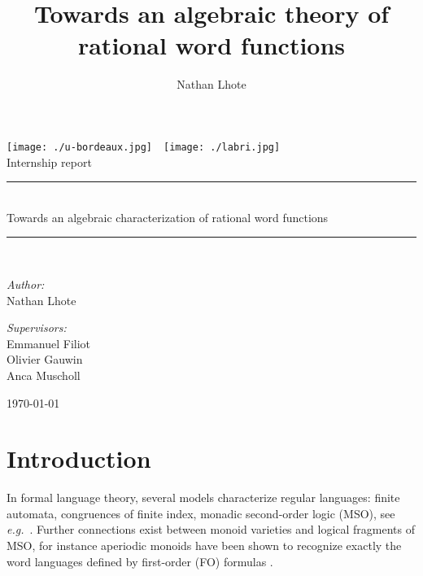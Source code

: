 \documentclass[12pt]{report}
\title{Towards an algebraic theory of rational word functions}
\author{Nathan Lhote}
\theoremstyle{definition}
\theoremstyle{remark}
\newcommand{\HRule}{\rule{\linewidth}{0.5mm}}
\begin{document}
\begin{titlepage}

\begin{center}

\texttt{[image: ./u-bordeaux.jpg]}~\hfill ~\texttt{[image: ./labri.jpg]}~\\[1cm]

\Large Internship report\\[0.5cm]

\HRule \\[0.4cm]
{ \huge Towards an algebraic characterization of rational word functions \\[0.4cm] }

\HRule \\[1.5cm]


\noindent
\begin{minipage}[t]{0.4\textwidth}
\begin{flushleft} \large
\emph{Author:}\\
Nathan Lhote
\end{flushleft}
\end{minipage}
\begin{minipage}[t]{0.4\textwidth}
\begin{flushright} \large
\emph{Supervisors:} \\
Emmanuel Filiot\footnotemark[1]\\
Olivier Gauwin\footnotemark[2]\\
Anca Muscholl\footnotemark[2]
\end{flushright}
\end{minipage}

\vfill

{\large \today}

\end{center}

\end{titlepage} 
\chapter*{Introduction}

In formal language theory, several models characterize regular languages: finite automata, congruences of finite index, monadic second-order logic (MSO), see \emph{e.g.}~\cite{buchi60,elgot61, trakhtenbrot61}.
Further connections exist between monoid varieties and logical fragments of MSO, for instance aperiodic monoids have been shown to recognize exactly the word languages defined by first-order (FO) formulas \cite{schutzenberger65,mcnaughtonp71}.
\end{document}
